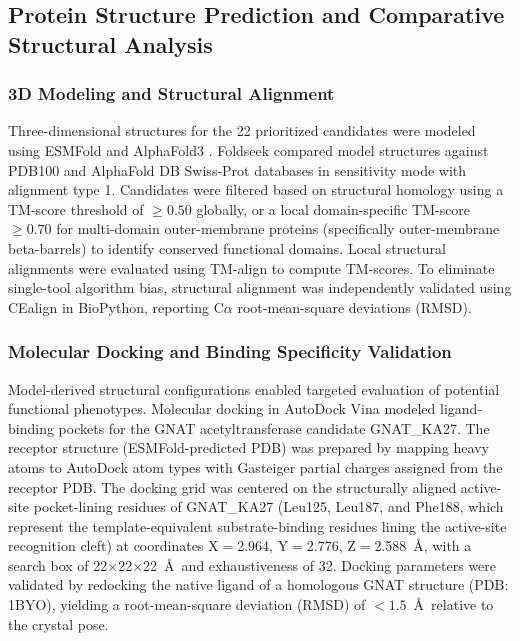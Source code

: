 \documentclass[pdflatex,sn-mathphys-num]{sn-jnl}
\begin{document}
\subsection{Protein Structure Prediction and Comparative Structural Analysis}\label{subsec:structure_prediction}
\subsubsection{3D Modeling and Structural Alignment}
Three-dimensional structures for the 22 prioritized candidates were modeled using ESMFold \cite{lin2023evolutionary} and AlphaFold3 \cite{abramson2024accurate}. Foldseek \cite{mirdita2022foldseek} compared model structures against PDB100 and AlphaFold DB Swiss-Prot databases in sensitivity mode with alignment type 1. Candidates were filtered based on structural homology using a TM-score threshold of $\ge 0.50$ globally, or a local domain-specific TM-score $\ge 0.70$ for multi-domain outer-membrane proteins (specifically outer-membrane beta-barrels) to identify conserved functional domains. Local structural alignments were evaluated using TM-align \cite{zhang2005tm} to compute TM-scores. To eliminate single-tool algorithm bias, structural alignment was independently validated using CEalign \cite{zhang2005tm} in BioPython, reporting C$\alpha$ root-mean-square deviations (RMSD).

\subsubsection{Molecular Docking and Binding Specificity Validation}
Model-derived structural configurations enabled targeted evaluation of potential functional phenotypes. Molecular docking in AutoDock Vina \cite{trott2010autodock} modeled ligand-binding pockets for the GNAT acetyltransferase candidate GNAT\_KA27. The receptor structure (ESMFold-predicted PDB) was prepared by mapping heavy atoms to AutoDock atom types with Gasteiger partial charges assigned from the receptor PDB. The docking grid was centered on the structurally aligned active-site pocket-lining residues of GNAT\_KA27 (Leu125, Leu187, and Phe188, which represent the template-equivalent substrate-binding residues lining the active-site recognition cleft) at coordinates X$\!=\!$2.964, Y$\!=\!$2.776, Z$\!=\!$2.588~\AA, with a search box of 22$\times$22$\times$22~\AA\ and exhaustiveness of 32. Docking parameters were validated by redocking the native ligand of a homologous GNAT structure (PDB: 1BYO), yielding a root-mean-square deviation (RMSD) of $< 1.5$~\AA\ relative to the crystal pose.
\end{document}
